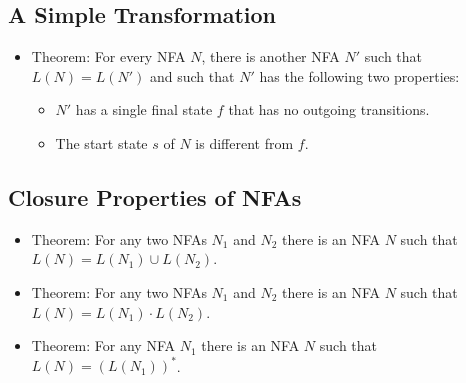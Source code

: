 \subsection{A Simple Transformation}
\begin{itemize}
    \item Theorem: For every NFA $N$, there is another NFA $N'$ such that $L(N) = L(N')$ and such that $N'$ has the following two properties:
    \begin{itemize}
        \item $N'$ has a single final state $f$ that has no outgoing transitions.
        \item The start state $s$ of $N$ is different from $f$.
    \end{itemize}
\end{itemize}

\subsection{Closure Properties of NFAs}
\begin{itemize}
    \item Theorem: For any two NFAs $N_1$ and $N_2$ there is an NFA $N$ such that $L(N) = L(N_1) \cup L(N_2)$.
    \item Theorem: For any two NFAs $N_1$ and $N_2$ there is an NFA $N$ such that $L(N) = L(N_1) \cdot L(N_2)$.
    \item Theorem: For any NFA $N_1$ there is an NFA $N$ such that $L(N) = (L(N_1))^{\ast}$.
\end{itemize}
